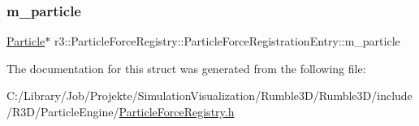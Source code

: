 \subsubsection{\texorpdfstring{m\+\_\+particle}{m\_particle}}
{\footnotesize\ttfamily \mbox{\hyperlink{classr3_1_1_particle}{Particle}}$\ast$ r3\+::\+Particle\+Force\+Registry\+::\+Particle\+Force\+Registration\+Entry\+::m\+\_\+particle}



The documentation for this struct was generated from the following file\+:\begin{DoxyCompactItemize}
\item 
C\+:/\+Library/\+Job/\+Projekte/\+Simulation\+Visualization/\+Rumble3\+D/\+Rumble3\+D/include/\+R3\+D/\+Particle\+Engine/\mbox{\hyperlink{_particle_force_registry_8h}{Particle\+Force\+Registry.\+h}}\end{DoxyCompactItemize}
